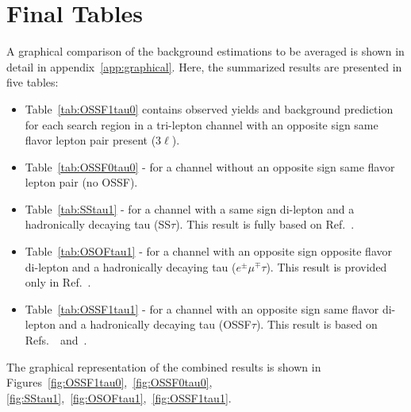 \section{Final Tables}
A graphical comparison of the background estimations to be averaged is shown in detail in appendix~\ref{app:graphical}. 
Here, the summarized results are presented in five tables: 
\begin{itemize}
\item Table~\ref{tab:OSSF1tau0} contains observed yields  and background prediction 
for each search region in a tri-lepton channel with an opposite sign same flavor lepton pair present (3$\ell$).
\item Table~\ref{tab:OSSF0tau0}  - for a channel without  an opposite sign same flavor lepton pair (no OSSF).
\item Table~\ref{tab:SStau1} - for a channel with a same sign di-lepton and a hadronically decaying tau (SS$\tau$). 
This result is fully based on Ref.~\cite{AN2012:248}.
\item Table~\ref{tab:OSOFtau1} - for a channel with an opposite sign opposite flavor di-lepton and 
a hadronically decaying tau ($e^\pm\mu^\mp\tau$). This result is provided only in Ref.~\cite{AN2012:255}.
\item Table~\ref{tab:OSSF1tau1} - for a channel with an opposite sign same flavor di-lepton and 
a hadronically decaying tau (OSSF$\tau$). This result is based on Refs.~\cite{AN2012:255}~and~\cite{AN2012:256}.
\end{itemize}

The graphical representation of the combined results is shown in Figures~\ref{fig:OSSF1tau0},~\ref{fig:OSSF0tau0},
\ref{fig:SStau1},~\ref{fig:OSOFtau1},~\ref{fig:OSSF1tau1}.

